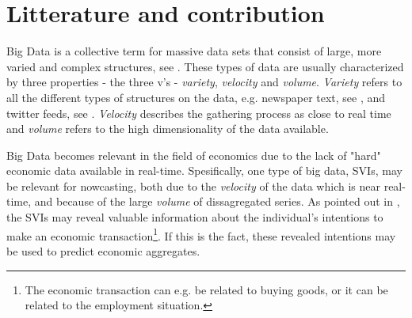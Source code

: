 \section{Litterature and contribution}\label{litterature}

Big Data is a collective term for massive data sets that consist of large, more varied and complex structures, see \textcite{zikopoulos2011}. These types of data are usually characterized by three properties - the three v's - \textit{variety}, \textit{velocity} and \textit{volume}. \textit{Variety} refers to all the different types of structures on the data, e.g. newspaper text, see \textcite{thorsrud2016}, and twitter feeds, see \textcite{antenucci2014}. \textit{Velocity} describes the gathering process as close to real time and \textit{volume} refers to the high dimensionality of the data available.

Big Data becomes relevant in the field of economics due to the lack of "hard" economic data available in real-time. Spesifically, one type of big data, SVIs, may be relevant for nowcasting, both due to the \textit{velocity} of the data which is near real-time, and because of the large \textit{volume} of dissagregated series. As pointed out in \textcite{wu2015}, the SVIs may reveal valuable information about the individual’s intentions to make an economic transaction\footnote{The economic transaction can e.g. be related to buying goods, or it can be related to the employment situation.}. If this is the fact, these revealed intentions may be used to predict economic aggregates. 

